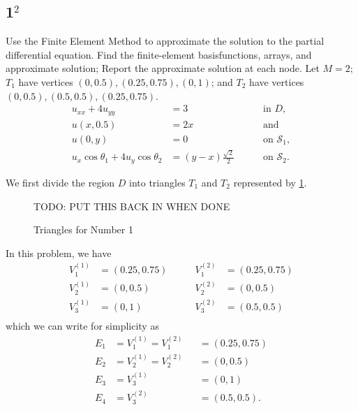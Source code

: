\documentclass[12pt]{article}
\begin{document}
\subsection{1$^2$}
Use the Finite Element Method to approximate the solution to the partial
differential equation. Find the finite-element basisfunctions, arrays,
and approximate solution; Report the approximate solution at each
node. Let $M=2$; $T_1$ have vertices $(0,0.5), (0.25,0.75), (0,1)$; and
$T_2$ have vertices $(0,0.5), (0.5,0.5), (0.25,0.75)$.
\begin{equation}
  \label{eq:1_q}
  \begin{aligned}
    u_{xx}+4u_{yy} &= 3 &&\quad\text{ in } D, \\
    u(x,0.5) &= 2x
    &&\quad\text{ and } \\
    u(0,y) &= 0
    &&\quad\text{ on } \mathcal{S}_1, \\
    u_{x}\cos\theta_1 + 4u_{y}\cos\theta_2 &= (y-x)\frac{\sqrt{2}}{2}
    &&\quad\text{ on } \mathcal{S}_2.
  \end{aligned}
\end{equation}

%
% 

We first divide the region $D$ into triangles $T_1$ and $T_2$
represented by \cref{fig:tri}.
\begin{figure}[H]
  \centering
  \Huge{TODO: PUT THIS BACK IN WHEN DONE}
  \caption{Triangles for Number 1}
  \label{fig:tri}
\end{figure}
In this problem, we have 
\begin{equation}
  \label{eq:1_v}
  \begin{aligned}
    V_1^{(1)} &= (0.25,0.75) &\qquad V_1^{(2)} &= (0.25,0.75) \\
    V_2^{(1)} &= (0,0.5)     &\qquad V_2^{(2)} &= (0,0.5) \\
    V_3^{(1)} &= (0,1)       &\qquad V_3^{(2)} &= (0.5,0.5) \\
  \end{aligned}
\end{equation}
which we can write for simplicity as
\begin{equation}
  \label{eq:1_e}
  \begin{aligned}
    E_1 &= V_1^{(1)} = V_1^{(2)} &&= (0.25,0.75) \\
    E_2 &= V_2^{(1)} = V_2^{(2)} &&= (0,0.5) \\
    E_3 &= V_3^{(1)} &&= (0,1) \\
    E_4 &= V_3^{(2)} &&= (0.5,0.5). \\
  \end{aligned}
\end{equation}
\end{document}
